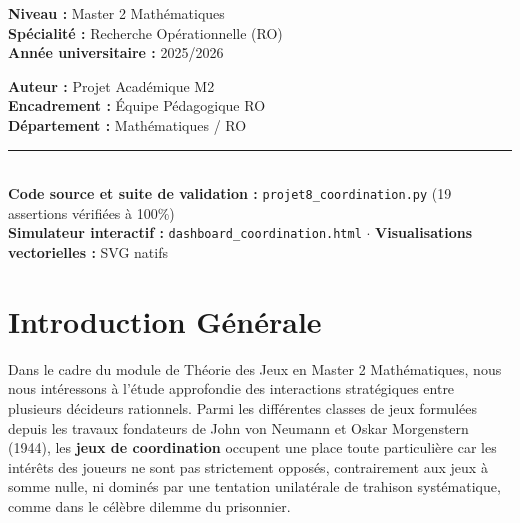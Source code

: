 \documentclass[11pt,a4paper]{article}
\begin{document}
\begin{titlepage}
\begin{center}
    \begin{minipage}{0.48\textwidth}
        \begin{flushleft} \large
            \textbf{Niveau :} Master 2 Mathématiques\\
            \textbf{Spécialité :} Recherche Opérationnelle (RO)\\
            \textbf{Année universitaire :} 2025/2026
        \end{flushleft}
    \end{minipage}
    \begin{minipage}{0.48\textwidth}
        \begin{flushright} \large
            \textbf{Auteur :} Projet Académique M2\\
            \textbf{Encadrement :} Équipe Pédagogique RO\\
            \textbf{Département :} Mathématiques / RO
        \end{flushright}
    \end{minipage}

    \vfill
    \rule{\linewidth}{0.6pt}\\[2mm]
    {\footnotesize \textbf{Code source et suite de validation :} \texttt{projet8\_coordination.py} (19 assertions vérifiées à 100\%)\\
    \textbf{Simulateur interactif :} \texttt{dashboard\_coordination.html} $\cdot$ \textbf{Visualisations vectorielles :} SVG natifs}
\end{center}
\end{titlepage}
\hypersetup{pageanchor=true}

\newpage
{}
\setcounter{page}{1}
\vspace*{0.5cm}

\section*{Introduction Générale}\label{sec:intro_gen}

Dans le cadre du module de Théorie des Jeux en Master 2 Mathématiques, nous nous intéressons à l'étude approfondie des interactions stratégiques entre plusieurs décideurs rationnels. Parmi les différentes classes de jeux formulées depuis les travaux fondateurs de John von Neumann et Oskar Morgenstern (1944), les \textbf{jeux de coordination} occupent une place toute particulière car les intérêts des joueurs ne sont pas strictement opposés, contrairement aux jeux à somme nulle, ni dominés par une tentation unilatérale de trahison systématique, comme dans le célèbre dilemme du prisonnier.
\end{document}
